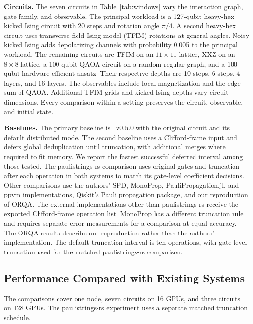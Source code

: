 \noindent\textbf{Circuits.}
The seven circuits in Table~\ref{tab:windows} vary the interaction graph, gate family, and observable.
The principal workload is a 127-qubit heavy-hex kicked Ising circuit with 20 steps and rotation angle $\pi/4$.
A second heavy-hex circuit uses transverse-field Ising model (TFIM) rotations at general angles.
Noisy kicked Ising adds depolarizing channels with probability 0.005 to the principal workload.
The remaining circuits are TFIM on an $11\times11$ lattice, XXZ on an $8\times8$ lattice, a 100-qubit QAOA circuit on a random regular graph, and a 100-qubit hardware-efficient ansatz.
Their respective depths are 10 steps, 6 steps, 4 layers, and 16 layers.
The observables include local magnetization and the edge sum of QAOA.
Additional TFIM grids and kicked Ising depths vary circuit dimensions.
Every comparison within a setting preserves the circuit, observable, and initial state.

\noindent\textbf{Baselines.}
The primary baseline is \cuPP~v0.5.0 with the original circuit and its default distributed mode.
The second baseline uses a Clifford-frame input and defers global deduplication until truncation, with additional merges where required to fit memory.
We report the fastest successful deferred interval among those tested.
The paulistrings-rs comparison uses original gates and truncation after each operation in both systems to match its gate-level coefficient decisions.
Other comparisons use the authors' SPD, MonoProp, PauliPropagation.jl, and ppvm implementations, Qiskit's Pauli propagation package, and our reproduction of ORQA.
The external implementations other than paulistrings-rs receive the exported Clifford-frame operation list.
MonoProp has a different truncation rule and requires separate error measurements for a comparison at equal accuracy.
The ORQA results describe our reproduction rather than the authors' implementation.
The default \SectorQ truncation interval is ten operations, with gate-level truncation used for the matched paulistrings-rs comparison.

\subsection{Performance Compared with Existing Systems}
The comparisons cover one node, seven circuits on 16 GPUs, and three circuits on 128 GPUs.
The paulistrings-rs experiment uses a separate matched truncation schedule.

